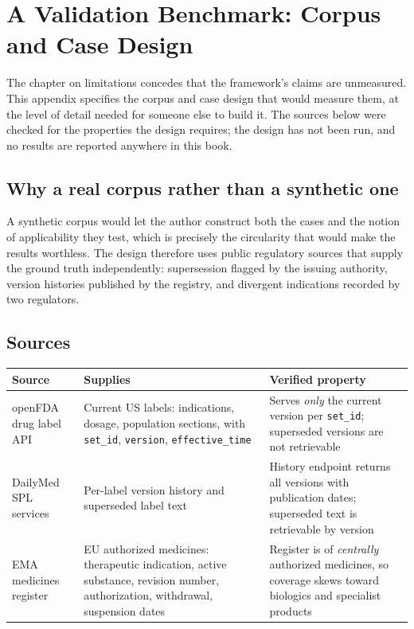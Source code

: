 \chapter{A Validation Benchmark: Corpus and Case Design}
\label{sec:benchmark}

The chapter on limitations concedes that the framework's claims are unmeasured. This
appendix specifies the corpus and case design that would measure them, at the level of
detail needed for someone else to build it. The sources below were checked for the
properties the design requires; the design has not been run, and no results are reported
anywhere in this book.

\section{Why a real corpus rather than a synthetic one}

A synthetic corpus would let the author construct both the cases and the notion of
applicability they test, which is precisely the circularity that would make the results
worthless. The design therefore uses public regulatory sources that supply the ground
truth independently: supersession flagged by the issuing authority, version histories
published by the registry, and divergent indications recorded by two regulators.

\section{Sources}

\begin{center}
\small
\begin{tabular}{@{}>{\raggedright\arraybackslash}p{3.0cm}>{\raggedright\arraybackslash}p{5.4cm}>{\raggedright\arraybackslash}p{5.6cm}@{}}
\toprule
Source & Supplies & Verified property \\
\midrule
openFDA drug label API
  & Current US labels: indications, dosage, population sections, with
    \texttt{set\_id}, \texttt{version}, \texttt{effective\_time}
  & Serves \emph{only} the current version per \texttt{set\_id}; superseded versions are
    not retrievable \\
\addlinespace
DailyMed SPL services
  & Per-label version history and superseded label text
  & History endpoint returns all versions with publication dates; superseded text is
    retrievable by version \\
\addlinespace
EMA medicines register
  & EU authorized medicines: therapeutic indication, active substance, revision number,
    authorization, withdrawal, suspension dates
  & Register is of \emph{centrally} authorized medicines, so coverage skews toward
    biologics and specialist products \\
\bottomrule
\end{tabular}
\end{center}

